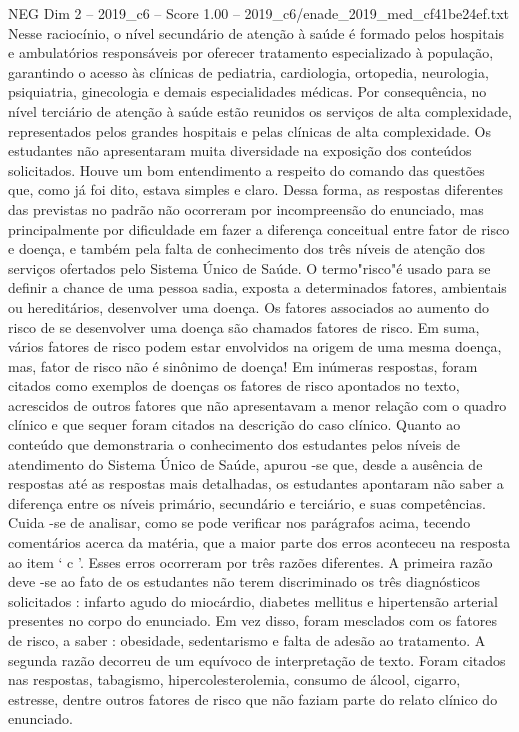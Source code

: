 \begin{textsample}{NEG Dim 2 – 2019\_c6 – Score 1.00 – 2019\_c6/enade\_2019\_med\_cf41be24ef.txt}
Nesse raciocínio, o nível secundário de atenção à saúde é formado pelos hospitais e ambulatórios responsáveis por oferecer tratamento especializado à população, garantindo o acesso às clínicas de pediatria, cardiologia, ortopedia, neurologia, psiquiatria, ginecologia e demais especialidades médicas.
Por consequência, no nível terciário de atenção à saúde estão reunidos os serviços de alta complexidade, representados pelos grandes hospitais e pelas clínicas de alta complexidade.
Os estudantes não apresentaram muita diversidade na exposição dos conteúdos solicitados.
Houve um bom entendimento a respeito do comando das questões que, como já foi dito, estava simples e claro.
Dessa forma, as respostas diferentes das previstas no padrão não ocorreram por incompreensão do enunciado, mas principalmente por dificuldade em fazer a diferença conceitual entre fator de risco e doença, e também pela falta de conhecimento dos três níveis de atenção dos serviços ofertados pelo Sistema Único de Saúde.
O termo"risco"é usado para se definir a chance de uma pessoa sadia, exposta a determinados fatores, ambientais ou hereditários, desenvolver uma doença.
Os fatores associados ao aumento do risco de se desenvolver uma doença são chamados fatores de risco.
Em suma, vários fatores de risco podem estar envolvidos na origem de uma mesma doença, mas, fator de risco não é sinônimo de doença!
Em inúmeras respostas, foram citados como exemplos de doenças os fatores de risco apontados no texto, acrescidos de outros fatores que não apresentavam a menor relação com o quadro clínico e que sequer foram citados na descrição do caso clínico.
Quanto ao conteúdo que demonstraria o conhecimento dos estudantes pelos níveis de atendimento do Sistema Único de Saúde, apurou -se que, desde a ausência de respostas até as respostas mais detalhadas, os estudantes apontaram não saber a diferença entre os níveis primário, secundário e terciário, e suas competências.
Cuida -se de analisar, como se pode verificar nos parágrafos acima, tecendo comentários acerca da matéria, que a maior parte dos erros aconteceu na resposta ao item ‘ c ’.
Esses erros ocorreram por três razões diferentes.
A primeira razão deve -se ao fato de os estudantes não terem discriminado os três diagnósticos solicitados : infarto agudo do miocárdio, diabetes mellitus e hipertensão arterial presentes no corpo do enunciado.
Em vez disso, foram mesclados com os fatores de risco, a saber : obesidade, sedentarismo e falta de adesão ao tratamento.
A segunda razão decorreu de um equívoco de interpretação de texto.
Foram citados nas respostas, tabagismo, hipercolesterolemia, consumo de álcool, cigarro, estresse, dentre outros fatores de risco que não faziam parte do relato clínico do enunciado.

\end{textsample}
